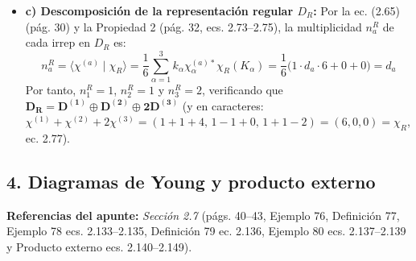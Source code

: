 \documentclass[11pt, a4paper]{article}
\begin{document}
\begin{itemize}
    \item \textbf{c) Descomposición de la representación regular $D_R$:}
    Por la ec. (2.65) (pág. 30) y la Propiedad 2 (pág. 32, ecs. 2.73--2.75), la multiplicidad $n_a^R$ de cada irrep en $D_R$ es:
    \[
    n_a^R = \langle \chi^{(a)} \mid \chi_R \rangle = \frac{1}{6} \sum_{\alpha=1}^3 k_\alpha \chi_\alpha^{(a)*} \chi_R(K_\alpha) = \frac{1}{6} \big( 1 \cdot d_a \cdot 6 + 0 + 0 \big) = d_a
    \]
    Por tanto, $n_1^R = 1$, $n_2^R = 1$ y $n_3^R = 2$, verificando que $\mathbf{D_R = D^{(1)} \oplus D^{(2)} \oplus 2 D^{(3)}}$ (y en caracteres: $\chi^{(1)} + \chi^{(2)} + 2\chi^{(3)} = (1+1+4, \, 1-1+0, \, 1+1-2) = (6, 0, 0) = \chi_R$, ec. 2.77).
\end{itemize}

\subsection*{4. Diagramas de Young y producto externo}
\textbf{Referencias del apunte:} \textit{Sección 2.7} (págs. 40--43, Ejemplo 76, Definición 77, Ejemplo 78 ecs. 2.133--2.135, Definición 79 ec. 2.136, Ejemplo 80 ecs. 2.137--2.139 y Producto externo ecs. 2.140--2.149).
\end{document}
